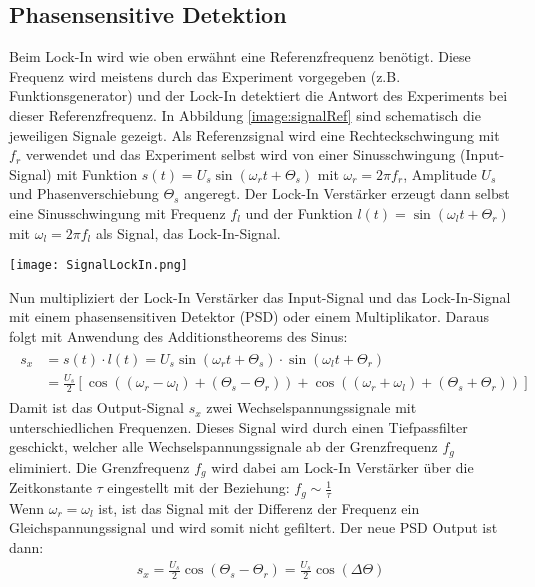 \subsection*{Phasensensitive Detektion}
Beim Lock-In wird wie oben erwähnt eine Referenzfrequenz benötigt. Diese Frequenz wird meistens durch das Experiment vorgegeben (z.B. Funktionsgenerator) und der Lock-In detektiert die Antwort des Experiments bei dieser Referenzfrequenz. In Abbildung \ref{image:signalRef} sind schematisch die jeweiligen Signale gezeigt. Als Referenzsignal wird eine Rechteckschwingung mit $f_{r}$ verwendet und das Experiment selbst wird von einer Sinusschwingung (Input-Signal) mit Funktion $s(t)=U_{s}\sin(\omega_{r}t + \Theta_{s})$ mit $\omega_{r}=2\pi f_{r}$, Amplitude $U_s$ und Phasenverschiebung $\Theta_{s}$ angeregt. Der Lock-In Verstärker erzeugt dann selbst eine Sinusschwingung mit Frequenz $f_l$ und der Funktion $l(t) = \sin(\omega_{l}t + \Theta_{r})$ mit $\omega_{l}=2\pi f_{l}$ als Signal, das Lock-In-Signal.
\begin{center}
    \texttt{[image: SignalLockIn.png]}
    \label{image:signalRef}
\end{center}
Nun multipliziert der Lock-In Verstärker das Input-Signal und das Lock-In-Signal mit einem phasensensitiven Detektor (PSD) oder einem Multiplikator. Daraus folgt mit Anwendung des Additionstheorems des Sinus:
\begin{gather}
    \begin{aligned}
        s_{x} &= s(t)\cdot l(t) = U_{s}\sin(\omega_{r}t + \Theta_{s}) \cdot \sin(\omega_{l}t + \Theta_{r})\\
                &= \frac{U_{s}}{2}\left[\cos((\omega_{r}-\omega_{l}) + (\Theta_s - \Theta_r)) + \cos((\omega_{r}+\omega_{l}) + (\Theta_s + \Theta_r))\right]
    \end{aligned}
\end{gather}
Damit ist das Output-Signal $s_x$ zwei Wechselspannungssignale mit unterschiedlichen Frequenzen. Dieses Signal wird durch einen Tiefpassfilter geschickt, welcher alle Wechselspannungssignale ab der Grenzfrequenz $f_g$ eliminiert. Die Grenzfrequenz $f_g$ wird dabei am Lock-In Verstärker über die Zeitkonstante $\tau$ eingestellt mit der Beziehung: $f_g\sim\frac{1}{\tau}$\\ Wenn $\omega_r = \omega_l$ ist, ist das Signal mit der Differenz der Frequenz ein Gleichspannungssignal und wird somit nicht gefiltert. Der neue PSD Output ist dann:
\begin{gather}
    s_{x} = \frac{U_s}{2} \cos(\Theta_s-\Theta_r) = \frac{U_s}{2} \cos(\Delta\Theta)  
\end{gather}
